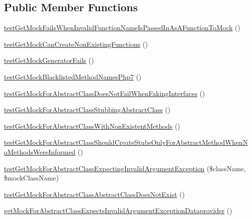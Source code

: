\subsection*{Public Member Functions}
\begin{DoxyCompactItemize}
\item 
\mbox{\hyperlink{class_framework___mock_object___generator_test_a99f9fa6e8000929f8884c388cafb6ecd}{test\+Get\+Mock\+Fails\+When\+Invalid\+Function\+Name\+Is\+Passed\+In\+As\+A\+Function\+To\+Mock}} ()
\item 
\mbox{\hyperlink{class_framework___mock_object___generator_test_a5c36ee780c629365f48b53664eafb78c}{test\+Get\+Mock\+Can\+Create\+Non\+Existing\+Functions}} ()
\item 
\mbox{\hyperlink{class_framework___mock_object___generator_test_a2a90041c169b433418d1521d06c02f96}{test\+Get\+Mock\+Generator\+Fails}} ()
\item 
\mbox{\hyperlink{class_framework___mock_object___generator_test_aedf87718b47f3b12a5275e4080d0ab74}{test\+Get\+Mock\+Blacklisted\+Method\+Names\+Php7}} ()
\item 
\mbox{\hyperlink{class_framework___mock_object___generator_test_a2485bbee2937fa40a9e9f2420d0690a4}{test\+Get\+Mock\+For\+Abstract\+Class\+Does\+Not\+Fail\+When\+Faking\+Interfaces}} ()
\item 
\mbox{\hyperlink{class_framework___mock_object___generator_test_a107a2c645881100a0668508e36d553e5}{test\+Get\+Mock\+For\+Abstract\+Class\+Stubbing\+Abstract\+Class}} ()
\item 
\mbox{\hyperlink{class_framework___mock_object___generator_test_a734affa034e0efef6fc1341db79d1e4b}{test\+Get\+Mock\+For\+Abstract\+Class\+With\+Non\+Existent\+Methods}} ()
\item 
\mbox{\hyperlink{class_framework___mock_object___generator_test_a0b512061d1db740bf54ab3f1e4890fb2}{test\+Get\+Mock\+For\+Abstract\+Class\+Should\+Create\+Stubs\+Only\+For\+Abstract\+Method\+When\+No\+Methods\+Were\+Informed}} ()
\item 
\mbox{\hyperlink{class_framework___mock_object___generator_test_a7b32817ec27f263e0b1246645d463b47}{test\+Get\+Mock\+For\+Abstract\+Class\+Expecting\+Invalid\+Argument\+Exception}} (\$class\+Name, \$mock\+Class\+Name)
\item 
\mbox{\hyperlink{class_framework___mock_object___generator_test_a3d22506eb11e6caafe26556538409fb7}{test\+Get\+Mock\+For\+Abstract\+Class\+Abstract\+Class\+Does\+Not\+Exist}} ()
\item 
\mbox{\hyperlink{class_framework___mock_object___generator_test_a2c6bd28e552faf352ce04bc7e11c4ac4}{get\+Mock\+For\+Abstract\+Class\+Expects\+Invalid\+Argument\+Exception\+Dataprovider}} ()

\end{DoxyCompactItemize}
